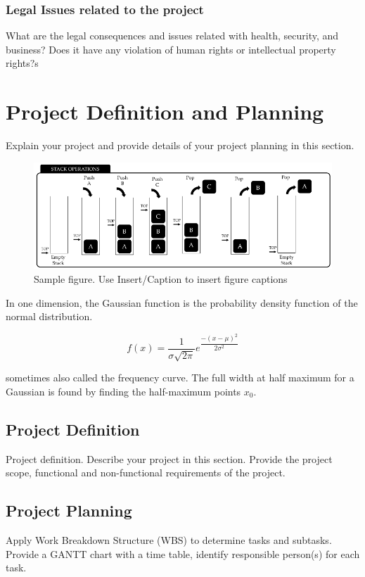 \documentclass{mefsdp}
\begin{document}
	\subsubsection{Legal Issues related to the project}
	What are the legal consequences and issues related with health, security, and business? Does it have any violation of human rights or intellectual property rights?s
	
	\section{Project Definition and Planning}
	Explain your project and provide details of your project planning in this section.
	\begin{figure}[h]
		\includegraphics[scale=1]{../figures/sample_figure}
		\caption[First sample figure]{Sample figure. Use Insert/Caption to insert figure captions}
	\end{figure}

	In one dimension, the Gaussian function is the probability density function of the normal distribution. 
	
	\begin{equation}
		f(x) = \frac{1}{\sigma\sqrt{2\pi}}e^{\dfrac{-(x-\mu)^2}{2\sigma^2}}
	\end{equation}
	
	sometimes also called the frequency curve. The full width at half maximum for a Gaussian is found by finding the half-maximum points $x_0$.
	
	\subsection{Project Definition}
	Project definition. Describe your project in this section. Provide the project scope, functional and non-functional requirements of the project. 
	
	\subsection{Project Planning}
	Apply Work Breakdown Structure (WBS) to determine tasks and subtasks. Provide a GANTT chart with a time table, identify responsible person(s) for each task.   
	
\end{document}
